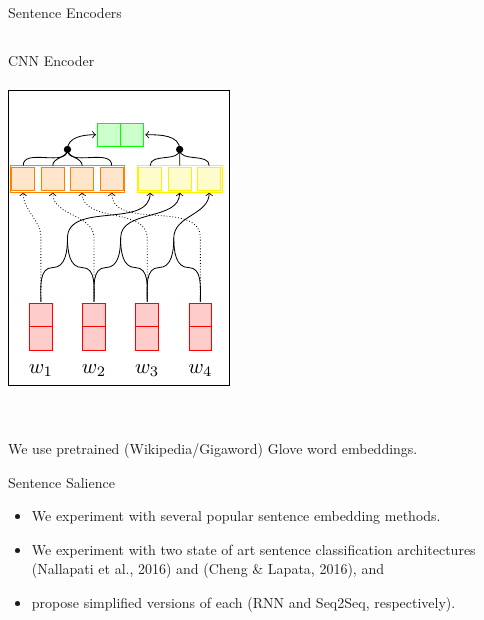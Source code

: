 \begin{frame}{Sentence Encoders}
\begin{columns}[t]
   \centering
   CNN Encoder\\~\\
   \includegraphics[]{images/section3/cnn_encoder.pdf}\\
 \end{columns}

~\\
We use pretrained (Wikipedia/Gigaword) Glove word embeddings.

\end{frame}


\begin{frame}{Sentence Salience}

    \begin{itemize}
        \item We experiment with several popular sentence embedding methods.
        \item We experiment with two state of art sentence classification
            architectures (Nallapati et al., 2016) and (Cheng \& Lapata, 2016),
            and
        \item propose simplified versions of each (RNN and Seq2Seq, respectively).

    \end{itemize}

\end{frame}

